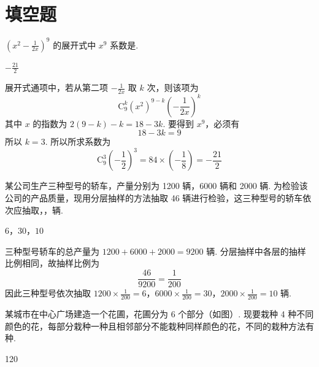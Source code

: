 \section{填空题}
\begin{problem}
\(\left(x^{2} - \frac{1}{2x}\right)^{9}\) 的展开式中 \(x^{9}\) 系数是\fillinblank{}.
\end{problem}

\begin{answer}
\(-\frac{21}{2}\)
\end{answer}

\begin{solution}
展开式通项中，若从第二项 \(-\frac{1}{2x}\) 取 \(k\) 次，则该项为
\[
\mathrm C_9^k\left(x^2\right)^{9-k}\left(-\frac{1}{2x}\right)^k
\]
其中 \(x\) 的指数为 \(2(9-k)-k=18-3k\). 要得到 \(x^9\)，必须有
\[
18-3k=9
\]
所以 \(k=3\).
所以所求系数为
\[
\mathrm C_9^3\left(-\frac12\right)^3=84\times\left(-\frac18\right)=-\frac{21}{2}
\]
\end{solution}

\begin{problem}
某公司生产三种型号的轿车，产量分别为 1200 辆，6000 辆和 2000 辆. 为检验该公司的产品质量，现用分层抽样的方法抽取 46 辆进行检验，这三种型号的轿车依次应抽取\fillinblank{}，\fillinblank{}，\fillinblank{}辆.
\end{problem}

\begin{answer}
\(6\)，\(30\)，\(10\)
\end{answer}

\begin{solution}
三种型号轿车的总产量为 \(1200+6000+2000=9200\) 辆. 分层抽样中各层的抽样比例相同，故抽样比例为
\[
\frac{46}{9200}=\frac1{200}
\]
因此三种型号依次抽取 \(1200\times\frac1{200}=6\)，\(6000\times\frac1{200}=30\)，\(2000\times\frac1{200}=10\) 辆.
\end{solution}

\begin{problem}
某城市在中心广场建造一个花圃，花圃分为 6 个部分（如图）. 现要栽种 4 种不同颜色的花，每部分栽种一种且相邻部分不能栽种同样颜色的花，不同的栽种方法有\fillinblank{}种.

\begin{center}
\end{center}
\end{problem}

\begin{answer}
120
\end{answer}

